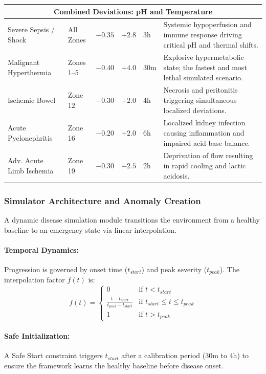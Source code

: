 \documentclass[sigconf]{acmart}
\begin{document}
\begin{table}[t]
\begin{tabular}{@{} l l c c l p{8cm} @{}}
    \multicolumn{6}{c}{\textbf{Combined Deviations: pH and Temperature}} \\
    \midrule
    Severe Sepsis / Shock & All Zones & $-0.35$ & $+2.8$ & 3h & Systemic hypoperfusion and immune response driving critical pH and thermal shifts. \\
    Malignant Hyperthermia & Zones 1--5 & $-0.40$ & $+4.0$ & 30m & Explosive hypermetabolic state; the fastest and most lethal simulated scenario. \\
    Ischemic Bowel & Zone 12 & $-0.30$ & $+2.0$ & 4h & Necrosis and peritonitis triggering simultaneous localized deviations. \\
    Acute Pyelonephritis & Zone 16 & $-0.20$ & $+2.0$ & 6h & Localized kidney infection causing inflammation and impaired acid-base balance. \\
    Adv. Acute Limb Ischemia & Zone 19 & $-0.30$ & $-2.5$ & 2h & Deprivation of flow resulting in rapid cooling and lactic acidosis. \\
    \bottomrule
    \end{tabular}
\end{table}

\subsubsection{Simulator Architecture and Anomaly Creation}
A dynamic disease simulation module transitions the environment from a healthy baseline to an emergency state via linear interpolation. 

\paragraph{Temporal Dynamics:} Progression is governed by onset time ($t_{start}$) and peak severity ($t_{peak}$). The interpolation factor $f(t)$ is:
$$f(t) = 
\begin{cases} 
0 & \text{if } t < t_{start} \\
\frac{t - t_{start}}{t_{peak} - t_{start}} & \text{if } t_{start} \le t \le t_{peak} \\
1 & \text{if } t > t_{peak} 
\end{cases}$$

\paragraph{Safe Initialization:} A Safe Start constraint triggers $t_{start}$ after a calibration period (30m to 4h) to ensure the framework learns the healthy baseline before disease onset.
\end{document}
